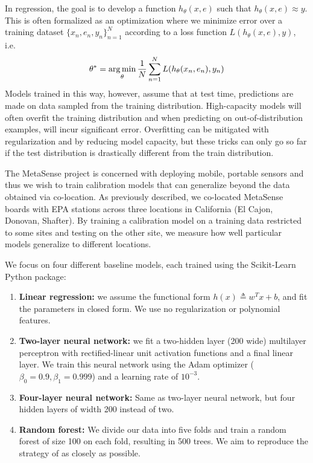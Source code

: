 \documentclass[journal abbreviation, manuscript]{copernicus}
\begin{document}
In regression, the goal is to develop a function $h_\theta(x, e)$
such that $h_\theta(x, e) \approx y$. This is often formalized as an optimization where we minimize error over a training dataset $\{x_n, e_n, y_n\}_{n = 1}^N$ according to a loss function $L(h_\theta(x, e), y)$, i.e. 
\begin{equation}
\theta^* = \operatorname*{arg\,min}_\theta \frac{1}{N}\sum_{n = 1}^N L(h_\theta(x_n, e_n), y_n)
\end{equation}
Models trained in this way, however, assume that at test time, predictions
are made on data sampled from the training distribution. 
High-capacity models will often overfit the training distribution and when
predicting on out-of-distribution examples, will incur significant
error. Overfitting can be mitigated with regularization and by reducing
model capacity, but these tricks can only go so far if the test distribution
is drastically different from the train distribution.

The MetaSense project is concerned with deploying mobile, portable
sensors and thus we wish to train calibration models
that can generalize beyond the data obtained via co-location.
As previously described, we co-located MetaSense boards with EPA stations across three locations in California (El Cajon, Donovan, Shafter).
By training a calibration model on a training data restricted to some sites and testing on the other site, we measure how well particular models generalize to different locations.

We focus on four different baseline models, each trained using the Scikit-Learn Python package: 
\begin{enumerate}
    \item \textbf{Linear regression:} we assume the functional form $h(x) \triangleq w^T x + b$, and fit the parameters in closed form. We use no regularization or polynomial features.
    \item \textbf{Two-layer neural network:} we fit a two-hidden layer (200 wide) multilayer perceptron with rectified-linear unit activation functions and a final linear layer. We train this neural network using the Adam optimizer ($\beta_0 = 0.9, \beta_1 = 0.999$) and a learning rate of $10^{-3}$.
    \item \textbf{Four-layer neural network:} Same as two-layer neural network, but four hidden layers of width 200 instead of two.
    \item \textbf{Random forest:} We divide our data into five folds and train a random forest of size 100 on each fold, resulting in 500 trees. We aim to reproduce the strategy of \citet{Zimmerman2018} as closely as possible.
\end{enumerate}
\end{document}
